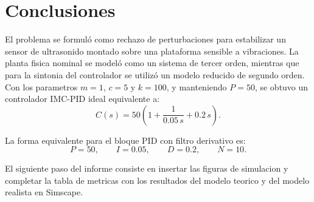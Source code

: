 \documentclass[11pt]{article}
\begin{document}
\section{Conclusiones}

El problema se formul\'o como rechazo de perturbaciones para estabilizar un sensor de ultrasonido montado sobre una plataforma sensible a vibraciones. La planta fisica nominal se model\'o como un sistema de tercer orden, mientras que para la sintonia del controlador se utiliz\'o un modelo reducido de segundo orden. Con los parametros $m=1$, $c=5$ y $k=100$, y manteniendo $P=50$, se obtuvo un controlador IMC-PID ideal equivalente a:
\[
C(s)=50\left(1+\frac{1}{0.05\,s}+0.2\,s\right).
\]

La forma equivalente para el bloque PID con filtro derivativo es:
\[
P=50,\qquad I=0.05,\qquad D=0.2,\qquad N=10.
\]

El siguiente paso del informe consiste en insertar las figuras de simulacion y completar la tabla de metricas con los resultados del modelo teorico y del modelo realista en Simscape.
\end{document}
